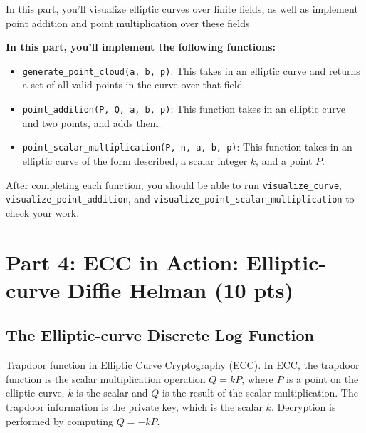 \documentclass{article}
\begin{document}
    \begin{tcolorbox}[enhanced,interior style={top color=Plum!20,bottom color=Plum!30}]
        In this part, you'll visualize elliptic curves over finite fields, as well as implement point addition and point multiplication over these fields
    
        \textbf{In this part, you'll implement the following functions:}
        \begin{itemize}
            \item \lstinline{generate_point_cloud(a, b, p)}: This takes in an elliptic curve and returns a set of all valid points in the curve over that field.
            \item \lstinline{point_addition(P, Q, a, b, p)}: This function takes in an elliptic curve and two points, and adds them.
            \item \lstinline{point_scalar_multiplication(P, n, a, b, p)}: This function takes in an elliptic curve of the form described, a scalar integer $k$, and a point $P$.
        \end{itemize}
        After completing each function, you should be able to run \lstinline{visualize_curve}, \lstinline{visualize_point_addition}, and \lstinline{visualize_point_scalar_multiplication} to check your work.
    \end{tcolorbox}

\section*{Part 4: ECC in Action: Elliptic-curve Diffie Helman (10 pts)}



\subsection*{The Elliptic-curve Discrete Log Function}



    \vspace{3mm}
    Trapdoor function in Elliptic Curve Cryptography (ECC). In ECC, the trapdoor function is the scalar multiplication operation $Q = kP$, where $P$ is a point on the elliptic curve, $k$ is the scalar and $Q$ is the result of the scalar multiplication. The trapdoor information is the private key, which is the scalar $k$. Decryption is performed by computing $Q = -kP$.
\end{document}
